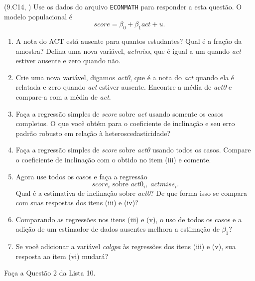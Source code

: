 \documentclass[12pt,letterpaper, onecolumn]{exam}
\begin{document}
\begin{questions}
\question\qstar (9.C14, \citep{wooldridge2016}) Use os dados do arquivo \texttt{ECONMATH} para responder a esta questão. O modelo populacional é
\[
score=\beta_0+\beta_1 act+u.
\]
\begin{enumerate}[label=(\roman*)]
    \item A nota do ACT está ausente para quantos estudantes? Qual é a fração da amostra? Defina uma nova variável, \textit{actmiss}, que é igual a um quando \textit{act} estiver ausente e zero quando não.
    \item Crie uma nova variável, digamos \textit{act0}, que é a nota do \textit{act} quando ela é relatada e zero quando \textit{act} estiver ausente. Encontre a média de \textit{act0} e compare-a com a média de \textit{act}.
    \item Faça a regressão simples de \textit{score} sobre \textit{act} usando somente os casos completos. O que você obtém para o coeficiente de inclinação e seu erro padrão robusto em relação à heteroscedasticidade?
    \item Faça a regressão simples de \textit{score} sobre \textit{act0} usando todos os casos. Compare o coeficiente de inclinação com o obtido no item (iii) e comente.
    \item Agora use todos os casos e faça a regressão
    \[
    score_i \text{ sobre } act0_i,\; actmiss_i.
    \]
    Qual é a estimativa de inclinação sobre \textit{act0}? De que forma isso se compara com suas respostas dos itens (iii) e (iv)?
    \item Comparando as regressões nos itens (iii) e (v), o uso de todos os casos e a adição de um estimador de dados ausentes melhora a estimação de \(\beta_1\)?
    \item Se você adicionar a variável \textit{colgpa} às regressões dos itens (iii) e (v), sua resposta ao item (vi) mudará?
\end{enumerate}


\vspace{2cm}
\question \qstar  Faça a Questão 2 da Lista 10.
\end{questions}
\newpage


\end{document}
